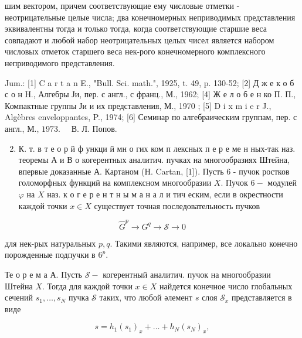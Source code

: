 \documentclass[10pt]{article}
\begin{document}
шим вектором, причем соответствующие ему числовые отметки - неотрицательные целые числа; два конечномерных неприводимых представления эквивалентны тогда и только тогда, когда соответствующие старшие веса совпадают и любой набор неотрицательных целых чисел является набором числовых отметок старшего веса нек-рого конечномерного комплексного неприводимого представления.



Jum.: [1] C a r t a n E., "Bull. Sci. math.", 1925, t. 49, p. 130-52; [2] Д ж е к о б с о н Н., Алгебры Ји, пер. с англ., с франц., М., 1962; [4] Ж е л о б е н ко П. П., Компактные группы Ји и их представления, М., 1970 ; [5] D i x m i e r J., Algèbres enveloppantes, P., 1974; [6] Семинар по алгебраическим группам, пер. с англ., М., $1973 . \quad$ В. Л. Попов.



\begin{enumerate}

  \setcounter{enumi}{1}

  \item К. т. в т е о р й ф ункци й мн о гих ком п лексных п е р е ме н ных-так наз. теоремы А и В о когерентных аналитич. пучках на многообразиях Штейна, впервые доказанные А. Картаном (H. Cartan, [1]). Пусть 6 - пучок ростков голоморфных функций на комплексном многообразии $X$. Пучок $6-$ модулей $\mathscr{\varphi}$ на $X$ наз. к о г е р е н т н ы м а н а л и тич еским, если в окрестности каждой точки $x \in X$ существует точная последовательность пучков

\end{enumerate}



\[

\hat{G}^{p} \longrightarrow G^{q} \longrightarrow \mathscr{S} \longrightarrow 0

\]



для нек-рых натуральных $p, q$. Такими являются, например, все локально конечно порожденные подпучки в $6^{p}$.



Те о р е м а А. Пусть $\mathscr{S}-$ когерентный аналитич. пучок на многообразии Штейна $X$. Тогда для каждой точки $x \in X$ найдется конечное число глобальных сечений $s_{1}, \ldots, s_{N}$ пучка $\mathscr{S}$ таких, что любой әлемент $s$ слоя $\mathscr{S}_{x}$ представляется в виде



\[

s=h_{1}\left(s_{1}\right)_{x}+\ldots+h_{N}\left(s_{N}\right)_{x},

\]
\end{document}
